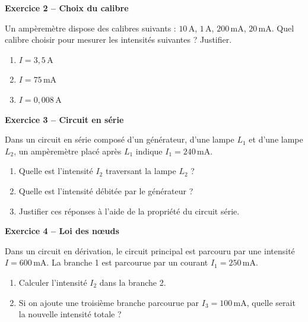 \documentclass[11pt,a4paper]{article}
\newcommand{\cadreblanc}[1]{%
\medskip\framebox[\linewidth][c]{%
\rule{0mm}{#1mm}}\par
\medskip}
\begin{document}
\cadreblanc{25}

\textbf{Exercice 2 -- Choix du calibre}

Un ampèremètre dispose des calibres suivants : $10\,\text{A}$, $1\,\text{A}$, $200\,\text{mA}$, $20\,\text{mA}$. Quel calibre choisir pour mesurer les intensités suivantes ? Justifier.
\begin{enumerate}
    \item $I = 3{,}5\,\text{A}$
    \item $I = 75\,\text{mA}$
    \item $I = 0{,}008\,\text{A}$
\end{enumerate}

\cadreblanc{25}

\textbf{Exercice 3 -- Circuit en série}

Dans un circuit en série composé d'un générateur, d'une lampe $L_1$ et d'une lampe $L_2$, un ampèremètre placé après $L_1$ indique $I_1 = 240\,\text{mA}$.
\begin{enumerate}
    \item Quelle est l'intensité $I_2$ traversant la lampe $L_2$ ?
    \item Quelle est l'intensité débitée par le générateur ?
    \item Justifier ces réponses à l'aide de la propriété du circuit série.
\end{enumerate}

\cadreblanc{25}

\textbf{Exercice 4 -- Loi des nœuds}

Dans un circuit en dérivation, le circuit principal est parcouru par une intensité $I = 600\,\text{mA}$. La branche 1 est parcourue par un courant $I_1 = 250\,\text{mA}$.
\begin{enumerate}
    \item Calculer l'intensité $I_2$ dans la branche 2.
    \item Si on ajoute une troisième branche parcourue par $I_3 = 100\,\text{mA}$, quelle serait la nouvelle intensité totale ?
\end{enumerate}

\cadreblanc{25}
\end{document}

